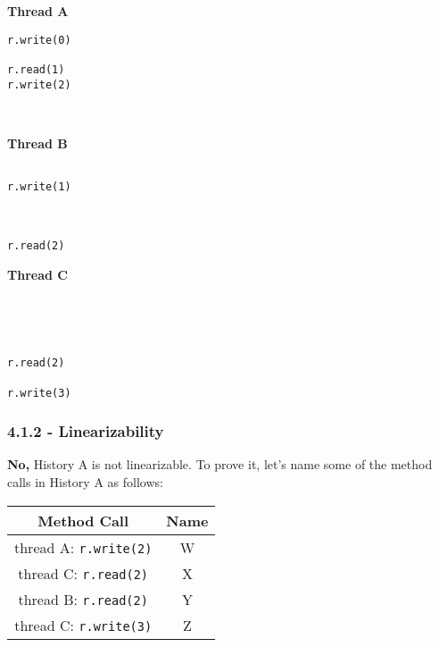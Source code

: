 \documentclass[11pt, letterpaper]{article}
\newcommand{\code}[1] { \texttt{#1} }
\begin{document}
\begin{figure*}[h!]
    \begin{minipage}{0.3\textwidth}
        \centering
        \textbf{Thread A}
        \begin{verbatim}
r.write(0)

r.read(1)
r.write(2)



        \end{verbatim}
    \end{minipage}
    \hspace{1cm}
    \begin{minipage}{0.3\textwidth}
        \centering
        \textbf{Thread B}
        \begin{verbatim}

r.write(1)



r.read(2)

        \end{verbatim}
    \end{minipage}
    \hspace{1cm}
    \begin{minipage}{0.3\textwidth}
        \centering
        \textbf{Thread C}
        \begin{verbatim}




r.read(2)

r.write(3)
        \end{verbatim}
    \end{minipage}
\end{figure*}

\subsubsection*{4.1.2 - Linearizability}
\label{ssub:4_1_2_linearizability}

\textbf{No,} History A is not linearizable. To prove it, let's name some of the method calls in History A as follows:

\begin{center}
    \begin{tabular}{|| c | c ||}
        \hline
        Method Call & Name\\
        \hline
        thread A: \code{r.write(2)} & W\\
        thread C: \code{r.read(2)} & X\\
        thread B: \code{r.read(2)} & Y\\
        thread C: \code{r.write(3)} & Z\\
        \hline
    \end{tabular}
\end{center}
\end{document}
